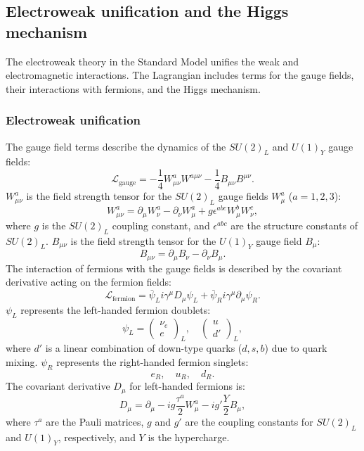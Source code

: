     \subsection{Electroweak unification and the Higgs mechanism}
        The electroweak theory in the Standard Model unifies the weak and electromagnetic interactions. 
        The Lagrangian includes terms for the gauge fields, their interactions with fermions, and the 
        Higgs mechanism. 
        \subsubsection{Electroweak unification}
            The gauge field terms describe the dynamics of the \(SU(2)_L\) and \(U(1)_Y\) gauge fields:
            \[
            \mathcal{L}_{\text{gauge}} = -\frac{1}{4} W_{\mu\nu}^a W^{a\mu\nu} - \frac{1}{4} B_{\mu\nu} B^{\mu\nu}.
            \]
            \( W_{\mu\nu}^a \) is the field strength tensor for the \(SU(2)_L\) gauge fields \( W_\mu^a \) (\(a = 1, 2, 3\)):
            \[
            W_{\mu\nu}^a = \partial_\mu W_\nu^a - \partial_\nu W_\mu^a + g \epsilon^{abc} W_\mu^b W_\nu^c,
            \]
            where \( g \) is the \(SU(2)_L\) coupling constant, and \(\epsilon^{abc}\) are the structure constants of \(SU(2)_L\).
            \( B_{\mu\nu} \) is the field strength tensor for the \(U(1)_Y\) gauge field \( B_\mu \):
            \[
            B_{\mu\nu} = \partial_\mu B_\nu - \partial_\nu B_\mu.
            \]
            The interaction of fermions with the gauge fields is described by the covariant derivative acting on the fermion fields:
            \[
            \mathcal{L}_{\text{fermion}} = \bar{\psi}_L i \gamma^\mu D_\mu \psi_L + \bar{\psi}_R i \gamma^\mu \partial_\mu \psi_R.
            \]
            \(\psi_L\) represents the left-handed fermion doublets:
            \[
            \psi_L = \begin{pmatrix} \nu_e \\ e \end{pmatrix}_L, \quad \begin{pmatrix} u \\ d' \end{pmatrix}_L,
            \]
            where \(d'\) is a linear combination of down-type quarks (\(d, s, b\)) due to quark mixing.
            \(\psi_R\) represents the right-handed fermion singlets:
            \[
            e_R, \quad u_R, \quad d_R.
            \]
            The covariant derivative \(D_\mu\) for left-handed fermions is:
            \[
            D_\mu = \partial_\mu - i g \frac{\tau^a}{2} W_\mu^a - i g' \frac{Y}{2} B_\mu,
            \]
            where \(\tau^a\) are the Pauli matrices, \(g\) and \(g'\) are the coupling constants for \(SU(2)_L\) and \(U(1)_Y\), respectively, and \(Y\) is the hypercharge.
        
